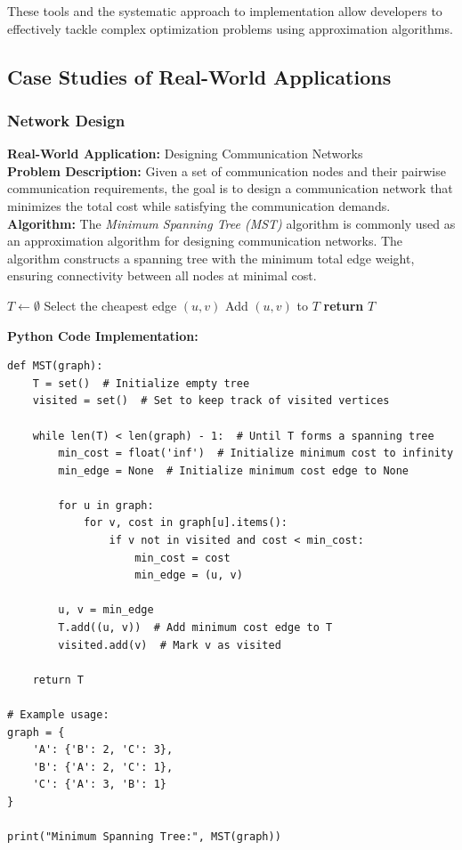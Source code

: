 \documentclass[12pt]{book} %
\begin{document}
These tools and the systematic approach to implementation allow developers to effectively tackle complex optimization problems using approximation algorithms.


\subsection{Case Studies of Real-World Applications}

\subsubsection{Network Design}

\textbf{Real-World Application:} Designing Communication Networks \\
\textbf{Problem Description:} Given a set of communication nodes and their pairwise communication requirements, the goal is to design a communication network that minimizes the total cost while satisfying the communication demands. \\
\textbf{Algorithm:} The \textit{Minimum Spanning Tree (MST)} algorithm is commonly used as an approximation algorithm for designing communication networks. The algorithm constructs a spanning tree with the minimum total edge weight, ensuring connectivity between all nodes at minimal cost.
\FloatBarrier
\begin{algorithm}
\caption{Minimum Spanning Tree Algorithm}
\begin{algorithmic}[1]
\State $T \gets \emptyset$ 
    \State Select the cheapest edge $(u, v)$
    \State Add $(u, v)$ to $T$
\EndWhile
\State \textbf{return} $T$
\EndProcedure
\end{algorithmic}
\end{algorithm}
\FloatBarrier
\textbf{Python Code Implementation:}
\FloatBarrier
\begin{lstlisting}
def MST(graph):
    T = set()  # Initialize empty tree
    visited = set()  # Set to keep track of visited vertices
    
    while len(T) < len(graph) - 1:  # Until T forms a spanning tree
        min_cost = float('inf')  # Initialize minimum cost to infinity
        min_edge = None  # Initialize minimum cost edge to None
        
        for u in graph:
            for v, cost in graph[u].items():
                if v not in visited and cost < min_cost:
                    min_cost = cost
                    min_edge = (u, v)
        
        u, v = min_edge
        T.add((u, v))  # Add minimum cost edge to T
        visited.add(v)  # Mark v as visited
    
    return T

# Example usage:
graph = {
    'A': {'B': 2, 'C': 3},
    'B': {'A': 2, 'C': 1},
    'C': {'A': 3, 'B': 1}
}

print("Minimum Spanning Tree:", MST(graph))
\end{lstlisting}
\end{document}
